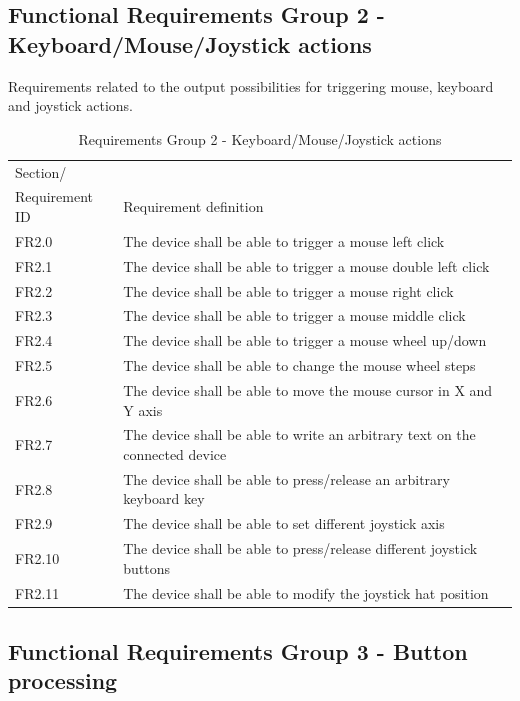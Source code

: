 \documentclass[]{scrreprt}%
\begin{document}
\subsection{Functional Requirements Group 2 - Keyboard/Mouse/Joystick actions}

Requirements related to the output possibilities for triggering mouse, keyboard and joystick actions.

\begin{table}[htb!]
 \centering
 \caption{Requirements Group 2 - Keyboard/Mouse/Joystick actions}
\label{req_group2}
 \begin{tabularx}{\textwidth}{|l|X|} \hline
 Section/\\ Requirement ID & Requirement definition\\ \hline  \hline
 FR2.0 & The device shall be able to trigger a mouse left click\\ \hline
 FR2.1 & The device shall be able to trigger a mouse double left click\\ \hline
 FR2.2 & The device shall be able to trigger a mouse right click\\ \hline
 FR2.3 & The device shall be able to trigger a mouse middle click\\ \hline
 FR2.4 & The device shall be able to trigger a mouse wheel up/down\\ \hline
 FR2.5 & The device shall be able to change the mouse wheel steps\\ \hline
 FR2.6 & The device shall be able to move the mouse cursor in X and Y axis\\ \hline
 FR2.7 & The device shall be able to write an arbitrary text on the connected device \\ \hline
 FR2.8 & The device shall be able to press/release an arbitrary keyboard key\\ \hline
 FR2.9 & The device shall be able to set different joystick axis\\ \hline
 FR2.10 & The device shall be able to press/release different joystick buttons\\ \hline
 FR2.11 & The device shall be able to modify the joystick hat position\\ \hline
 \end{tabularx}
\end{table}

\subsection{Functional Requirements Group 3 - Button processing}
\end{document}
